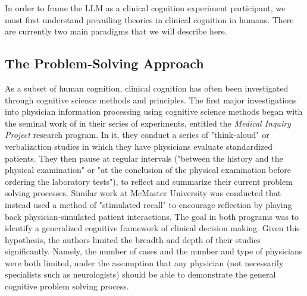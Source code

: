 In order to frame the LLM as a clinical cognition experiment participant, we must first understand prevailing theories in clinical cognition in humans. There are currently two main paradigms that we will describe here. 

\subsection{The Problem-Solving Approach}


As a subset of human cognition, clinical cognition has often been investigated through cognitive science methods and principles. The first major investigations into physician information processing using cognitive science methods began with the seminal work of \citet{elstein1978medical} in their series of experiments, entitled the \emph{Medical Inquiry Project} research program. In it, they conduct a series of "think-aloud" or verbalization studies in which they have physicians evaluate standardized patients. They then pause at regular intervals ("between the history and the physical examination" or "at the conclusion of the physical examination before ordering the laboratory tests"),%
to reflect and summarize their current problem solving processes. Similar work at McMaster University was conducted that instead used a method of "stimulated recall" to encourage reflection by playing back physician-simulated patient interactions. The goal in both programs was to identify a generalized cognitive framework of clinical decision making. Given this hypothesis, the authors limited the breadth and depth of their studies significantly. Namely, the number of cases and the number and type of physicians were both limited, under the assumption that any physician (not necessarily specialists such as neurologists) should be able to demonstrate the general cognitive problem solving process. 

